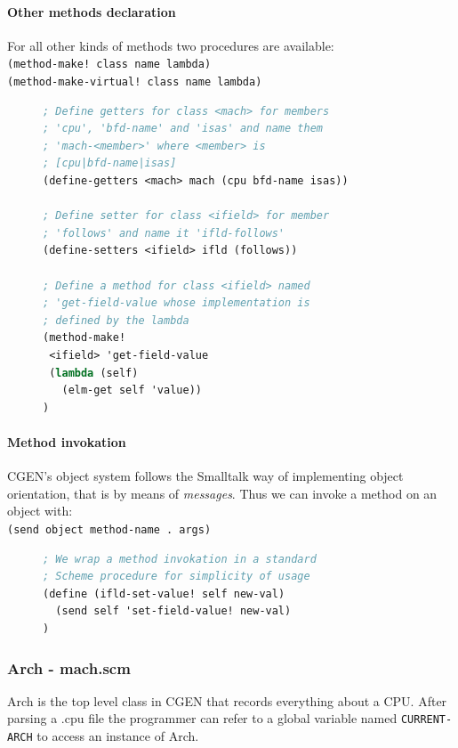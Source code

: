 \documentclass{article}
\begin{document}
\paragraph{Other methods declaration}
For all other kinds of methods two procedures are available:\\
\texttt{(method-make! class name lambda)} \\
\texttt{(method-make-virtual! class name lambda)}

\begin{figure}[H]
\begin{lstlisting}[language=Scheme, caption=Example of methods declaration for a class]
; Define getters for class <mach> for members
; 'cpu', 'bfd-name' and 'isas' and name them
; 'mach-<member>' where <member> is
; [cpu|bfd-name|isas]
(define-getters <mach> mach (cpu bfd-name isas))

; Define setter for class <ifield> for member
; 'follows' and name it 'ifld-follows'
(define-setters <ifield> ifld (follows))

; Define a method for class <ifield> named
; 'get-field-value whose implementation is
; defined by the lambda
(method-make!
 <ifield> 'get-field-value
 (lambda (self)
   (elm-get self 'value))
)
\end{lstlisting}
\end{figure}

\paragraph{Method invokation}
CGEN's object system follows the Smalltalk way of implementing object orientation, that is by means of \emph{messages}. Thus we can invoke a method on  an object with:\\
\texttt{(send object method-name . args)}

\begin{figure}[H]
\begin{lstlisting}[language=Scheme, caption=Example of methods invokation]
; We wrap a method invokation in a standard
; Scheme procedure for simplicity of usage
(define (ifld-set-value! self new-val)
  (send self 'set-field-value! new-val)
)
\end{lstlisting}
\end{figure}

\subsubsection{Arch - mach.scm}
Arch is the top level class in CGEN that records everything about a CPU.
After parsing a .cpu file the programmer can refer to a global variable named \texttt{CURRENT-ARCH} to access an instance of Arch.
\end{document}
